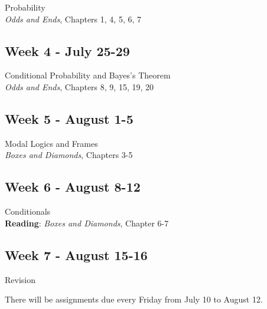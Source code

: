 \documentclass[10pt]{article}
\begin{document}
Probability \\
\textit{Odds and Ends}, Chapters 1, 4, 5, 6, 7
 
\subsection*{Week 4 - July 25-29}

Conditional Probability and Bayes's Theorem\\
\textit{Odds and Ends}, Chapters 8, 9, 15, 19, 20

\subsection*{Week 5 - August 1-5}

Modal Logics and Frames \\
\textit{Boxes and Diamonds}, Chapters 3-5

\subsection*{Week 6 - August 8-12}

Conditionals \\
\textbf{Reading}: \textit{Boxes and Diamonds}, Chapter 6-7

\subsection*{Week 7 - August 15-16}

Revision

\bigskip

There will be assignments due every Friday from July 10 to August 12.
\end{document}
